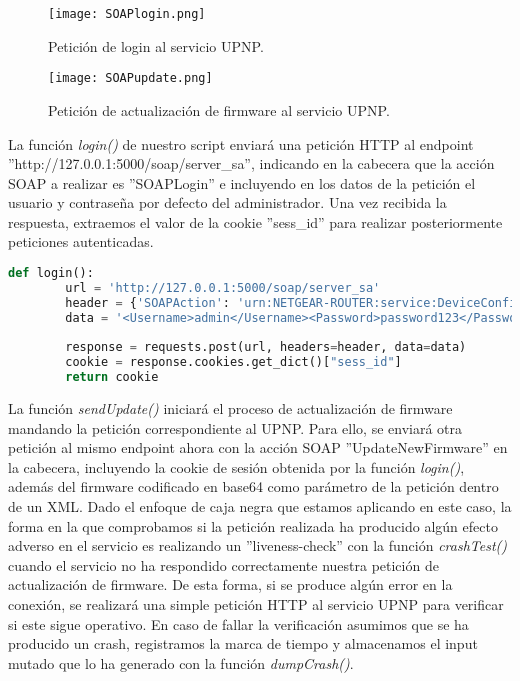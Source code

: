\begin{figure}[H]
    \centering
    \texttt{[image: SOAPlogin.png]}
    \caption{Petición de login al servicio UPNP.}
    \label{fig:SOAPlogin}
\end{figure}

\begin{figure}[H]
    \centering
    \texttt{[image: SOAPupdate.png]}
    \caption{Petición de actualización de firmware al servicio UPNP.}
    \label{fig:SOAPupdate}
\end{figure}

La función \textit{login()} de nuestro script enviará una petición HTTP al endpoint 
''http://127.0.0.1:5000/soap/server\_sa'', indicando en la cabecera que la acción SOAP a realizar es ''SOAPLogin''
e incluyendo en los datos de la petición el usuario y contraseña por defecto del administrador. Una vez 
recibida la respuesta, extraemos el valor de la cookie ''sess\_id'' para realizar posteriormente peticiones
autenticadas.

\begin{lstlisting}[language=python, caption=Función para realizar login en el servicio UPNP., captionpos=b,
    frame=single, breaklines, showstringspaces=false]
    def login():
        url = 'http://127.0.0.1:5000/soap/server_sa'
        header = {'SOAPAction': 'urn:NETGEAR-ROUTER:service:DeviceConfig:1#SOAPLogin'}
        data = '<Username>admin</Username><Password>password123</Password>'
        
        response = requests.post(url, headers=header, data=data)
        cookie = response.cookies.get_dict()["sess_id"]
        return cookie
\end{lstlisting}

La función \textit{sendUpdate()} iniciará el proceso de actualización de firmware mandando la petición correspondiente al 
UPNP. Para ello, se enviará otra petición al mismo endpoint ahora con la acción SOAP ''UpdateNewFirmware'' en la cabecera,
incluyendo la cookie de sesión obtenida por la función \textit{login()}, además del firmware codificado en base64 como parámetro 
de la petición dentro de un XML. Dado el enfoque de caja negra que estamos aplicando en este caso, la forma en la que comprobamos 
si la petición realizada ha producido algún efecto adverso en el servicio es realizando un ''liveness-check'' con la función \textit{crashTest()}
cuando el servicio no ha respondido correctamente nuestra petición de actualización de firmware. De esta forma, si se produce algún error
en la conexión, se realizará una simple petición HTTP al servicio UPNP para verificar si este sigue operativo. En caso de fallar la 
verificación asumimos que se ha producido un crash, registramos la marca de tiempo y almacenamos el input mutado que lo ha generado con la función
\textit{dumpCrash()}.

